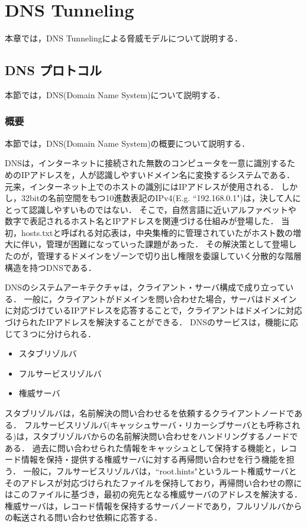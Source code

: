 \section{DNS Tunneling}
\label{sec:dns-tunneling}
本章では，DNS Tunnelingによる脅威モデルについて説明する．

\subsection{DNS プロトコル}
本節では，DNS(Domain Name System)について説明する．
\label{sec:dns-protocol}
\subsubsection{概要}
本節では，DNS(Domain Name System)の概要について説明する．

DNSは，インターネットに接続された無数のコンピュータを一意に識別するためのIPアドレスを，人が認識しやすいドメイン名に変換するシステムである．
元来，インターネット上でのホストの識別にはIPアドレスが使用される．
しかし，32bitの名前空間をもつ10進数表記のIPv4(E.g. ``192.168.0.1")は，決して人にとって認識しやすいものではない．
そこで，自然言語に近いアルファベットや数字で表記されるホスト名とIPアドレスを関連づける仕組みが登場した．
当初，hosts.txtと呼ばれる対応表は，中央集権的に管理されていたがホスト数の増大に伴い，管理が困難になっていった課題があった．
その解決策として登場したのが，管理するドメインをゾーンで切り出し権限を委譲していく分散的な階層構造を持つDNSである．

DNSのシステムアーキテクチャは，クライアント・サーバ構成で成り立っている．
一般に，クライアントがドメインを問い合わせた場合，サーバはドメインに対応づけているIPアドレスを応答することで，クライアントはドメインに対応づけられたIPアドレスを解決することができる．
DNSのサービスは，機能に応じて３つに分けられる．
\begin{itemize}
 \item スタブリゾルバ
 \vspace{-3mm}
 \item フルサービスリゾルバ
 \vspace{-3mm}
 \item 権威サーバ
\end{itemize}

スタブリゾルバは，名前解決の問い合わせるを依頼するクライアントノードである．
フルサービスリゾルバ(キャッシュサーバ・リカーシブサーバとも呼称される)は，スタブリゾルバからの名前解決問い合わせをハンドリングするノードである．
過去に問い合わせられた情報をキャッシュとして保持する機能と，レコード情報を保持・提供する権威サーバに対する再帰問い合わせを行う機能を担う．
一般に，フルサービスリゾルバは，``root.hints"というルート権威サーバとそのアドレスが対応づけられたファイルを保持しており，再帰問い合わせの際にはこのファイルに基づき，最初の宛先となる権威サーバのアドレスを解決する．
権威サーバは，レコード情報を保持するサーバノードであり，フルリゾルバからの転送される問い合わせ依頼に応答する．

